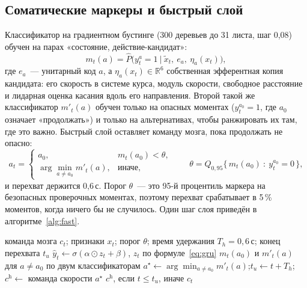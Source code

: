 \documentclass[10pt]{article}
\begin{document}
\subsection{Соматические маркеры и быстрый слой}
Классификатор на градиентном бустинге \citep{pedregosa2011} (300 деревьев до 31 листа, шаг 0,08) обучен на парах «состояние,
действие-кандидат»:
\begin{equation}
m_t(a)=\hat P\big(y^{a}_t=1\ \big|\ \tilde x_t,\ e_a,\ \eta_a(x_t)\big),
\end{equation}
где $e_a$~--- унитарный код $a$, а $\eta_a(x_t)\in\mathbb{R}^6$ собственная эфферентная копия кандидата: его скорость в системе
курса, модуль скорости, свободное расстояние и лидарная оценка касания вдоль его направления. Второй такой же классификатор
$m'_t(a)$ обучен только на опасных моментах ($y^{a_0}_t=1$, где $a_0$ означает «продолжать») и только на альтернативах, чтобы
ранжировать их там, где это важно. Быстрый слой оставляет команду мозга, пока продолжать не опасно:
\begin{equation}
a_t=\begin{cases}a_0, & m_t(a_0)<\theta,\\[2pt]
\arg\min_{a\ne a_0} m'_t(a), & \text{иначе},\end{cases}
\qquad \theta=Q_{0{,}95}\big\{\,m_t(a_0)\ :\ y^{a_0}_t=0\,\big\},
\end{equation}
и перехват держится 0,6\,с. Порог $\theta$~--- это 95-й процентиль маркера на безопасных проверочных моментах, поэтому перехват
срабатывает в 5\,\% моментов, когда ничего бы не случилось. Один шаг слоя приведён в алгоритме~\ref{alg:fast}.

\begin{algorithm}[t]
\caption{Один шаг быстрого слоя (каждые 0,1\,с).}\label{alg:fast}
\begin{algorithmic}[1]
\Require команда мозга $c_t$; признаки $x_t$; порог $\theta$; время удержания $T_h=0{,}6$\,с; конец перехвата $t_u$
\State $\hat y_t\gets\sigma(\alpha\odot z_t+\beta)$, $z_t$ по формуле~\eqref{eq:gru} 
\State $m_t(a_0)$ и $m'_t(a)$ для $a\ne a_0$ по двум классификаторам
  \State $a^\star\gets\arg\min_{a\ne a_0} m'_t(a)$;\quad $t_u\gets t+T_h$;\quad $c^{\mathrm{h}}\gets$ команда скорости $a^\star$
\EndIf
\State \Return $c^{\mathrm{h}}$, если $t\le t_u$, иначе $c_t$
\end{algorithmic}
\end{algorithm}
\end{document}
